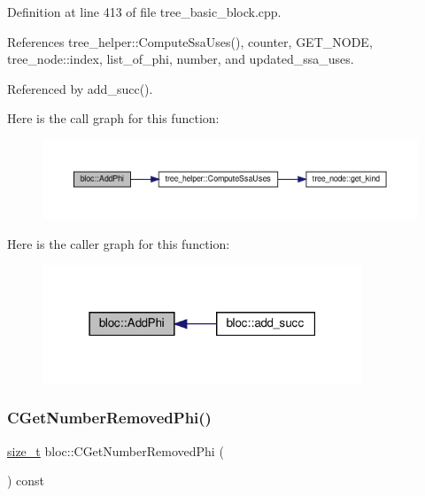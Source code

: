 Definition at line 413 of file tree\+\_\+basic\+\_\+block.\+cpp.



References tree\+\_\+helper\+::\+Compute\+Ssa\+Uses(), counter, G\+E\+T\+\_\+\+N\+O\+DE, tree\+\_\+node\+::index, list\+\_\+of\+\_\+phi, number, and updated\+\_\+ssa\+\_\+uses.



Referenced by add\+\_\+succ().

Here is the call graph for this function\+:
\nopagebreak
\begin{figure}[H]
\begin{center}
\leavevmode
\includegraphics[width=350pt]{d6/df6/structbloc_ae0aa810f7bc461f0166232a5f23d4760_cgraph}
\end{center}
\end{figure}
Here is the caller graph for this function\+:
\nopagebreak
\begin{figure}[H]
\begin{center}
\leavevmode
\includegraphics[width=271pt]{d6/df6/structbloc_ae0aa810f7bc461f0166232a5f23d4760_icgraph}
\end{center}
\end{figure}
\mbox{\label{structbloc_a2e3a87383a8f5cb319bfaaa11fcfefd7}} 
\subsubsection{\texorpdfstring{C\+Get\+Number\+Removed\+Phi()}{CGetNumberRemovedPhi()}}
{\footnotesize\ttfamily \hyperlink{tutorial__fpt__2017_2intro_2sixth_2test_8c_a7c94ea6f8948649f8d181ae55911eeaf}{size\+\_\+t} bloc\+::\+C\+Get\+Number\+Removed\+Phi (\begin{DoxyParamCaption}{ }\end{DoxyParamCaption}) const}




